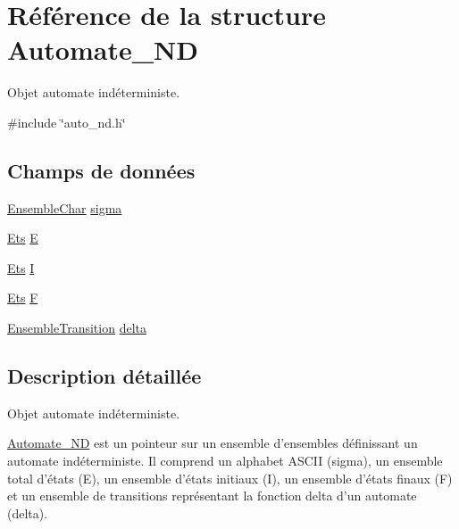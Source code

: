 \hypertarget{struct_automate___n_d}{\section{\-Référence de la structure \-Automate\-\_\-\-N\-D}
\label{struct_automate___n_d}
}


\-Objet automate indéterministe.  




{\ttfamily \#include \char`\"{}auto\-\_\-nd.\-h\char`\"{}}

\subsection*{\-Champs de données}
\begin{DoxyCompactItemize}
\item 
\hyperlink{auto__nd_8h_a8a9f3c362f156e37cdf72bfac024d7e3}{\-Ensemble\-Char} \hyperlink{struct_automate___n_d_a7933064dbc75475ee4dcd408a4707d0d}{sigma}
\item 
\hyperlink{auto__nd_8h_ab97da0c1b1e5f14d8f0cec086e90fece}{\-Ets} \hyperlink{struct_automate___n_d_aaf06b1de553b579c708e8d3a72252ff8}{\-E}
\item 
\hyperlink{auto__nd_8h_ab97da0c1b1e5f14d8f0cec086e90fece}{\-Ets} \hyperlink{struct_automate___n_d_ab814f5651b88a864f155f6fe428806b6}{\-I}
\item 
\hyperlink{auto__nd_8h_ab97da0c1b1e5f14d8f0cec086e90fece}{\-Ets} \hyperlink{struct_automate___n_d_af21e5b6b3c70a14bc833c833e1c3c1e1}{\-F}
\item 
\hyperlink{auto__nd_8h_abefd29f277cc57fe5d7540dcfa9c9edc}{\-Ensemble\-Transition} \hyperlink{struct_automate___n_d_ab0a6aaf56ad2b80412c18ed3b18db517}{delta}
\end{DoxyCompactItemize}


\subsection{\-Description détaillée}
\-Objet automate indéterministe. 

\hyperlink{struct_automate___n_d}{\-Automate\-\_\-\-N\-D} est un pointeur sur un ensemble d'ensembles définissant un automate indéterministe. \-Il comprend un alphabet \-A\-S\-C\-I\-I (sigma), un ensemble total d'états (\-E), un ensemble d'états initiaux (\-I), un ensemble d'états finaux (\-F) et un ensemble de transitions représentant la fonction delta d'un automate (delta). 

